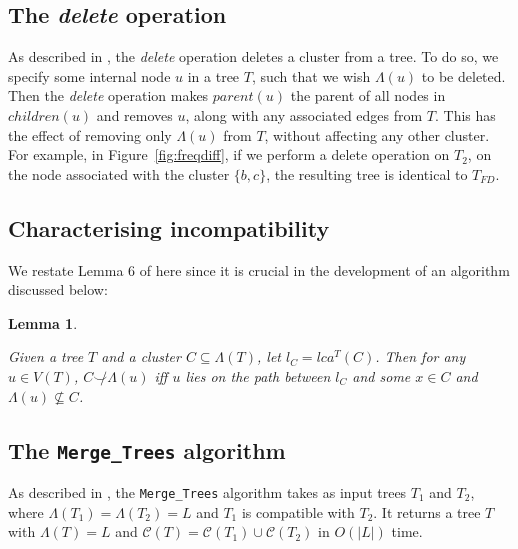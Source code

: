 \documentclass{article}
\newcommand{\compatible}{\smile}
\newcommand{\leafset}{\Lambda}
\newtheorem{incompatibility}{Lemma}
\begin{document}
    \subsection{The \textit{delete} operation}
    \label{subsec:delete}
    As described in \cite{jansson2018algorithms}, the \textit{delete} operation deletes a cluster from a tree. To do so, we specify some internal node $u$ in a tree $T$, such that we wish $\leafset(u)$ to be deleted. Then the \textit{delete} operation makes $parent(u)$ the parent of all nodes in $children(u)$ and removes $u$, along with any associated edges from $T$. This has the effect of removing only $\leafset(u)$ from $T$, without affecting any other cluster. For example, in Figure~\ref{fig:freqdiff}, if we perform a delete operation on $T_2$, on the node associated with the cluster $\{b, c\}$, the resulting tree is identical to $T_{FD}$.

    \subsection{Characterising incompatibility}
    We restate Lemma 6 of \cite{jansson2018algorithms} here since it is crucial in the development of an algorithm discussed below:
    \newline

    \begin{incompatibility}
        \label{lem:incompatibility}

        Given a tree $T$ and a cluster $C \subseteq \leafset(T)$, let $l_C = lca^T(C)$. Then for any $u \in V(T)$, $C \not\compatible \leafset(u)$ iff $u$ lies on the path between $l_C$ and some $x \in C$ and $\leafset(u) \not\subseteq C$.
    \end{incompatibility}

    \subsection{The \texttt{Merge\_Trees} algorithm}
    \label{subsec:mergetrees}

    As described in \cite{jansson2016improved}, the \texttt{Merge\_Trees} algorithm takes as input trees $T_1$ and $T_2$, where $\leafset(T_1) = \leafset(T_2) = L$ and $T_1$ is compatible with $T_2$. It returns a tree $T$ with $\leafset(T) = L$ and $\mathcal{C}(T) = \mathcal{C}(T_1) \cup \mathcal{C}(T_2)$ in $O(|L|)$ time.
\end{document}
